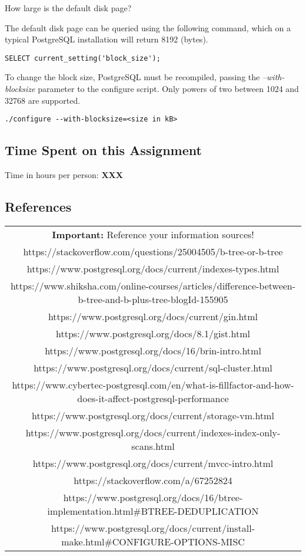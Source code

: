 \documentclass[11pt]{scrartcl}
\begin{document}
How large is the default disk page?

The default disk page can be queried using the following command, which on a typical PostgreSQL installation will return 8192 (bytes).

\begin{lstlisting}[style=dbtsql]
SELECT current_setting('block_size');
\end{lstlisting}

To change the block size, PostgreSQL must be recompiled, passing the \textit{--with-blocksize} parameter to the configure script. Only powers of two between 1024 and 32768 are supported.

\begin{lstlisting}
./configure --with-blocksize=<size in kB>
\end{lstlisting}

\subsection*{Time Spent on this Assignment}

Time in hours per person: \textbf{XXX}

\subsection*{References}

\begin{table}[H]
  \centering
  \begin{tabular}{c}
    \hline
    \textbf{Important:} Reference your information sources! \tabularnewline
    https://stackoverflow.com/questions/25004505/b-tree-or-b-tree \tabularnewline
    https://www.postgresql.org/docs/current/indexes-types.html \tabularnewline
    https://www.shiksha.com/online-courses/articles/difference-between-b-tree-and-b-plus-tree-blogId-155905 \tabularnewline
    https://www.postgresql.org/docs/current/gin.html \tabularnewline
    https://www.postgresql.org/docs/8.1/gist.html \tabularnewline
    https://www.postgresql.org/docs/16/brin-intro.html \tabularnewline
    https://www.postgresql.org/docs/current/sql-cluster.html \tabularnewline
    https://www.cybertec-postgresql.com/en/what-is-fillfactor-and-how-does-it-affect-postgresql-performance \tabularnewline
    https://www.postgresql.org/docs/current/storage-vm.html \tabularnewline
    https://www.postgresql.org/docs/current/indexes-index-only-scans.html \tabularnewline
    https://www.postgresql.org/docs/current/mvcc-intro.html \tabularnewline
    https://stackoverflow.com/a/67252824 \tabularnewline
    https://www.postgresql.org/docs/16/btree-implementation.html#BTREE-DEDUPLICATION \tabularnewline
    https://www.postgresql.org/docs/current/install-make.html#CONFIGURE-OPTIONS-MISC
    \hline
  \end{tabular}
\end{table}
\end{document}
